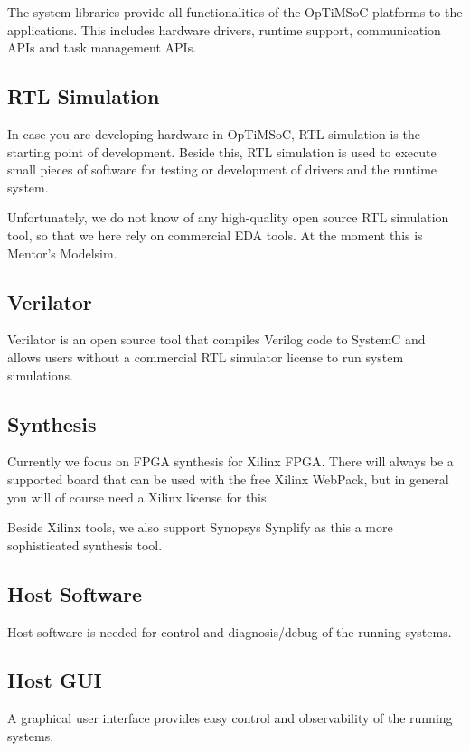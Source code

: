 The system libraries provide all functionalities of the OpTiMSoC
platforms to the applications. This includes hardware drivers, runtime
support, communication APIs and task management APIs.

\subsection*{RTL Simulation}

In case you are developing hardware in OpTiMSoC, RTL simulation is the
starting point of development. Beside this, RTL simulation is used to
execute small pieces of software for testing or development of drivers
and the runtime system.

Unfortunately, we do not know of any high-quality open source RTL
simulation tool, so that we here rely on commercial EDA tools. At the
moment this is Mentor's Modelsim.

\subsection*{Verilator}

Verilator is an open source tool that compiles Verilog code to SystemC
and allows users without a commercial RTL simulator license to run
system simulations.

\subsection*{Synthesis}

Currently we focus on FPGA synthesis for Xilinx FPGA. There will
always be a supported board that can be used with the free Xilinx
WebPack, but in general you will of course need a Xilinx license for
this.

Beside Xilinx tools, we also support Synopsys Synplify as this a more
sophisticated synthesis tool.

\subsection*{Host Software}

Host software is needed for control and diagnosis/debug of the running
systems. 

\subsection*{Host GUI}

A graphical user interface provides easy control and observability of
the running systems.